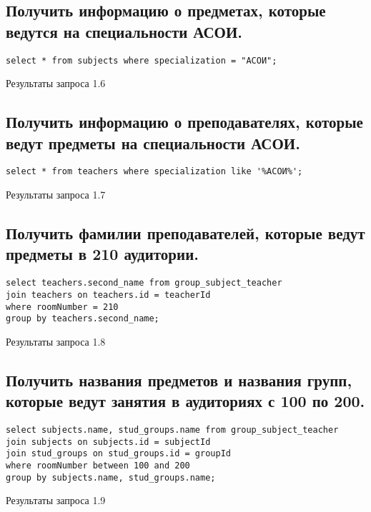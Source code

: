 \documentclass[a4paper,8pt]{article}
\begin{document}
\subsection{Получить информацию о предметах, которые ведутся на специальности АСОИ.}
\begin{verbatim}
select * from subjects where specialization = "АСОИ";
\end{verbatim}
\begin{table}[H]
\centering

\caption{Результаты запроса 1.6}
\end{table}

\subsection{Получить информацию о преподавателях, которые ведут предметы на специальности АСОИ.}
\begin{verbatim}
select * from teachers where specialization like '%АСОИ%';
\end{verbatim}
\begin{table}[H]
\centering

\caption{Результаты запроса 1.7}
\end{table}

\subsection{Получить фамилии преподавателей, которые ведут предметы в 210 аудитории.}
\begin{verbatim}
select teachers.second_name from group_subject_teacher
join teachers on teachers.id = teacherId
where roomNumber = 210
group by teachers.second_name;
\end{verbatim}
\begin{table}[H]
\centering

\caption{Результаты запроса 1.8}
\end{table}

\subsection{Получить названия предметов и названия групп, которые ведут занятия в аудиториях с 100 по 200.}
\begin{verbatim}
select subjects.name, stud_groups.name from group_subject_teacher
join subjects on subjects.id = subjectId
join stud_groups on stud_groups.id = groupId
where roomNumber between 100 and 200
group by subjects.name, stud_groups.name;
\end{verbatim}
\begin{table}[H]
\centering

\caption{Результаты запроса 1.9}
\end{table}
\end{document}
